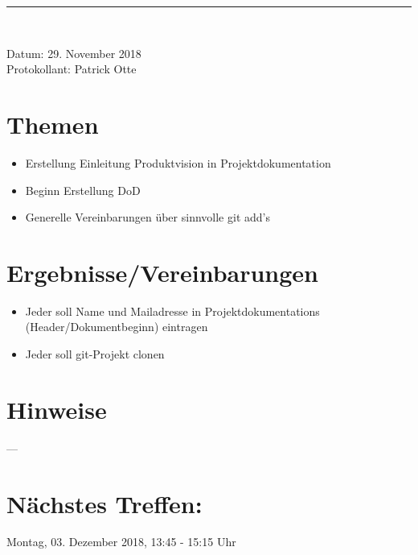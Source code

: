 \begin{center}  
\vspace{15pt}\nointerlineskip\rule{\textwidth}{0.2pt}\\ 
\vspace{0.5pt}\nointerlineskip
\end{center} 
\large Datum: 29. November 2018\vspace{3pt}\\\large Protokollant: Patrick Otte
\section{Themen}
\begin{itemize}
\item Erstellung Einleitung Produktvision in Projektdokumentation
\item Beginn Erstellung DoD
\item Generelle Vereinbarungen über sinnvolle git add's
\end{itemize}
\section{Ergebnisse/Vereinbarungen}
\begin{itemize}
\item Jeder soll Name und Mailadresse in Projektdokumentations (Header/Dokumentbeginn) eintragen
\item Jeder soll git-Projekt clonen
\end{itemize}
\section{Hinweise}
---
\section*{Nächstes Treffen:}
Montag, 03. Dezember 2018, 13:45 - 15:15 Uhr